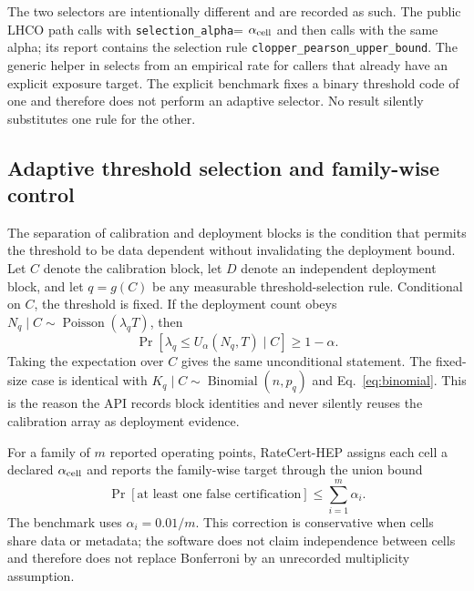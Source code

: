 \documentclass[submission, Phys]{SciPost}
\begin{document}
The two selectors are intentionally different and are recorded as such.  The
public LHCO path calls  with
\texttt{selection\_alpha}= $\alpha_{\rm cell}$ and then calls
 with the same alpha; its report contains the selection rule
\texttt{clopper\_pearson\_upper\_bound}.  The generic
 helper in  selects from an empirical
rate for callers that already have an explicit exposure target.  The explicit
benchmark fixes a binary threshold code of one and therefore does not perform
an adaptive selector.  No result silently substitutes one rule for the other.

\subsection{Adaptive threshold selection and family-wise control}

The separation of calibration and deployment blocks is the condition that
permits the threshold to be data dependent without invalidating the deployment
bound.  Let $C$ denote the calibration block, let $D$ denote an independent
deployment block, and let $q=g(C)$ be any measurable threshold-selection rule.
Conditional on $C$, the threshold is fixed.  If the deployment count obeys
$N_q\mid C\sim\operatorname{Poisson}(\lambda_qT)$, then
\begin{equation}
 \Pr\!\left[\lambda_q\le U_\alpha(N_q,T)\mid C\right]\ge 1-\alpha .
 \label{eq:conditional-poisson}
\end{equation}
Taking the expectation over $C$ gives the same unconditional statement.  The
fixed-size case is identical with $K_q\mid C\sim\operatorname{Binomial}(n,p_q)$
and Eq.~\eqref{eq:binomial}.  This is the reason the API records block
identities and never silently reuses the calibration array as deployment
evidence.

For a family of $m$ reported operating points, RateCert-HEP assigns each cell a
declared $\alpha_{\rm cell}$ and reports the family-wise target through the
union bound
\begin{equation}
 \Pr[\text{at least one false certification}]
 \le \sum_{i=1}^{m}\alpha_i .
 \label{eq:familywise}
\end{equation}
The benchmark uses $\alpha_i=0.01/m$.  This correction is conservative when
cells share data or metadata; the software does not claim independence between
cells and therefore does not replace Bonferroni by an unrecorded multiplicity
assumption.
\end{document}
